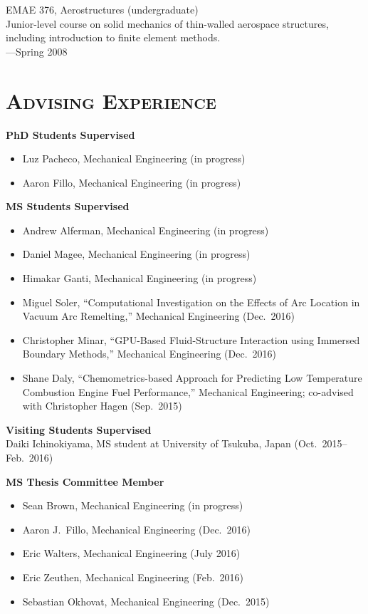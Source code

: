 \documentclass[margin,line,11pt]{res}
\begin{document}
\begin{resume}
EMAE 376, Aerostructures (undergraduate) \\
Junior-level course on solid mechanics of thin-walled aerospace structures, including introduction to finite element methods. \\
---Spring 2008

\section{\textsc{Advising Experience}}

\textbf{PhD Students Supervised}
\begin{itemize}[leftmargin=*]
\item Luz Pacheco, Mechanical Engineering (in progress)
\item Aaron Fillo, Mechanical Engineering (in progress)
\end{itemize}

\textbf{MS Students Supervised}
\begin{itemize}[leftmargin=*]
\item Andrew Alferman, Mechanical Engineering (in progress)
\item Daniel Magee, Mechanical Engineering (in progress)
\item Himakar Ganti, Mechanical Engineering (in progress)
\item Miguel Soler, ``Computational Investigation on the Effects of Arc Location in Vacuum Arc Remelting,'' Mechanical Engineering (Dec.\ 2016)
\item Christopher Minar, ``GPU-Based Fluid-Structure Interaction using Immersed Boundary Methods,'' Mechanical Engineering (Dec.\ 2016)
\item Shane Daly, ``Chemometrics-based Approach for Predicting Low Temperature Combustion Engine Fuel Performance,'' Mechanical Engineering; co-advised with Christopher Hagen (Sep.\ 2015)
\end{itemize}

\textbf{Visiting Students Supervised} \\
Daiki Ichinokiyama, MS student at University of Tsukuba, Japan (Oct.\ 2015--Feb.\ 2016)


\textbf{MS Thesis Committee Member}
\begin{itemize}[leftmargin=*]
\item Sean Brown, Mechanical Engineering (in progress)
\item Aaron J.~Fillo, Mechanical Engineering (Dec.\ 2016)
\item Eric Walters, Mechanical Engineering (July 2016)
\item Eric Zeuthen, Mechanical Engineering (Feb.\ 2016)
\item Sebastian Okhovat, Mechanical Engineering (Dec.\ 2015)
\end{itemize}


\end{resume}
\end{document}
